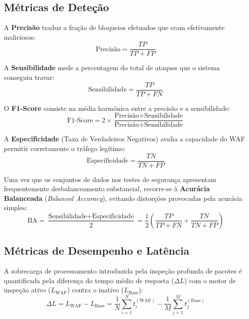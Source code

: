 \documentclass[11pt,a4paper]{article}
\begin{document}
\subsection{Métricas de Deteção}
A \textbf{Precisão} traduz a fração de bloqueios efetuados que eram efetivamente maliciosos:
\begin{equation}
    \text{Precisão} = \frac{TP}{TP + FP}
\end{equation}

A \textbf{Sensibilidade} mede a percentagem do total de ataques que o sistema conseguiu travar:
\begin{equation}
    \text{Sensibilidade} = \frac{TP}{TP + FN}
\end{equation}

O \textbf{F1-Score} consiste na média harmónica entre a precisão e a sensibilidade:
\begin{equation}
    \text{F1-Score} = 2 \times \frac{\text{Precisão} \times \text{Sensibilidade}}{\text{Precisão} + \text{Sensibilidade}}
\end{equation}

A \textbf{Especificidade} (Taxa de Verdadeiros Negativos) avalia a capacidade do WAF permitir corretamente o tráfego legítimo:
\begin{equation}
    \text{Especificidade} = \frac{TN}{TN + FP}
\end{equation}

Uma vez que os conjuntos de dados nos testes de segurança apresentam frequentemente desbalanceamento substancial, recorre-se à \textbf{Acurácia Balanceada} (\textit{Balanced Accuracy}), evitando distorções provocadas pela acurácia simples:
\begin{equation}
    \text{BA} = \frac{\text{Sensibilidade} + \text{Especificidade}}{2} = \frac{1}{2} \left( \frac{TP}{TP + FN} + \frac{TN}{TN + FP} \right)
\end{equation}

\subsection{Métricas de Desempenho e Latência}
A sobrecarga de processamento introduzida pela inspeção profunda de pacotes é quantificada pela diferença do tempo médio de resposta ($\Delta L$) com o motor de inspeção ativo ($L_{\text{WAF}}$) contra o inativo ($L_{\text{Base}}$):
\begin{equation}
    \Delta L = L_{\text{WAF}} - L_{\text{Base}} = \frac{1}{N}\sum_{i=1}^{N} t_{i}^{(\text{WAF})} - \frac{1}{M}\sum_{j=1}^{M} t_{j}^{(\text{Base})}
\end{equation}
\end{document}
